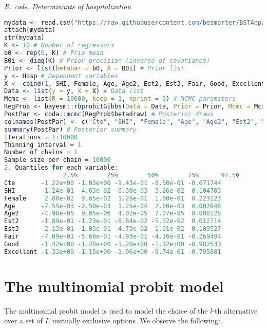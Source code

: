 \begin{tcolorbox}[enhanced,width=4.67in,center upper,
	fontupper=\large\bfseries,drop shadow southwest,sharp corners]
	\textit{R. code. Determinants of hospitalization}
	\begin{VF}
		\begin{lstlisting}[language=R]			
mydata <- read.csv("https://raw.githubusercontent.com/besmarter/BSTApp/refs/heads/master/DataApp/2HealthMed.csv", sep = ",", header = TRUE, quote = "")
attach(mydata)
str(mydata)
K <- 10 # Number of regressors
b0 <- rep(0, K) # Prio mean
B0i <- diag(K) # Prior precision (inverse of covariance)
Prior <- list(betabar = b0, A = B0i) # Prior list
y <- Hosp # Dependent variables
X <- cbind(1, SHI, Female, Age, Age2, Est2, Est3, Fair, Good, Excellent) # Regressors
Data <- list(y = y, X = X) # Data list
Mcmc <- list(R = 10000, keep = 1, nprint = 0) # MCMC parameters
RegProb <- bayesm::rbprobitGibbs(Data = Data, Prior = Prior, Mcmc = Mcmc) # Inference using bayesm package
PostPar <- coda::mcmc(RegProb$betadraw) # Posterior draws
colnames(PostPar) <- c("Cte", "SHI", "Female", "Age", "Age2", "Est2", "Est3", "Fair", "Good", "Excellent") # Names
summary(PostPar) # Posterior summary
Iterations = 1:10000
Thinning interval = 1 
Number of chains = 1 
Sample size per chain = 10000
2. Quantiles for each variable:
				2.5%        25%        50%        75%      97.5%
Cte       -1.22e+00 -1.03e+00 -9.43e-01 -8.50e-01 -0.671744
SHI       -1.24e-01 -4.63e-02 -6.30e-03  3.26e-02  0.104703
Female     2.80e-02  9.65e-02  1.28e-01  1.60e-01  0.223123
Age       -7.55e-03 -2.50e-03  1.25e-04  2.80e-03  0.007646
Age2      -4.98e-05  9.05e-06  4.02e-05  7.07e-05  0.000128
Est2      -1.89e-01 -1.23e-01 -8.84e-02 -5.32e-02  0.012714
Est3      -2.13e-01 -1.03e-01 -4.73e-02  1.01e-02  0.109527
Fair      -7.09e-01 -5.69e-01 -4.93e-01 -4.16e-01 -0.269494
Good      -1.42e+00 -1.28e+00 -1.20e+00 -1.12e+00 -0.982533
Excellent -1.33e+00 -1.15e+00 -1.06e+00 -9.74e-01 -0.795881
\end{lstlisting}
	\end{VF}
\end{tcolorbox} 

\section{The multinomial probit model}\label{sec64}
The multinomial probit model is used to model the choice of the $l$-th alternative over a set of $L$ mutually exclusive options. We observe the following:

